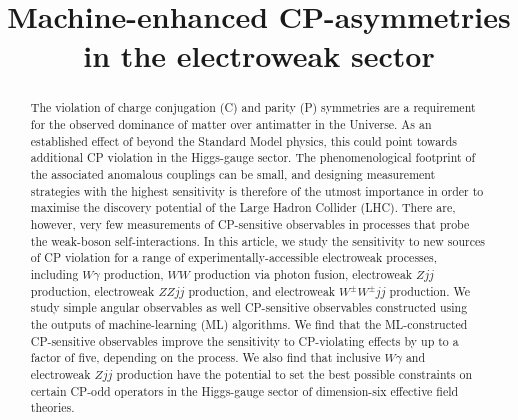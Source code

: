 \documentclass[twocolumn,preprintnumbers,superscriptaddress,nofootinbib,aps,prd,floatfix]{revtex4}
\begin{document}
\providecommand{\abs}[1]{\lvert#1\rvert}

\newcommand{\Znunujets}{(Z\to{\nu\bar{\nu}})+\text{jets}}
\newcommand{\Welnujets}{(W\to{\ell\nu})+\text{jets}}
\newcommand{\Znunujet}{(Z\to{\nu\bar{\nu}})+\text{jet}}
\newcommand{\Welnujet}{(W\to{\ell\nu})+\text{jet}} 


\title{Machine-enhanced CP-asymmetries in the electroweak sector}
\begin{abstract}
The violation of charge conjugation (C) and parity (P) symmetries are a requirement for the observed dominance of matter over antimatter in the Universe. As an established effect of beyond the Standard Model physics, this could point towards additional CP violation in the Higgs-gauge sector. The phenomenological footprint of the associated anomalous couplings can be small, and designing measurement strategies with the highest sensitivity is therefore of the utmost importance in order to maximise the discovery potential of the Large Hadron Collider (LHC). There are, however, very few  measurements of CP-sensitive observables in processes that probe the weak-boson self-interactions. In this article, we study the sensitivity to new sources of CP violation for a range of experimentally-accessible electroweak processes, including $W\gamma$ production, $WW$ production via photon fusion, electroweak $Zjj$ production, electroweak $ZZjj$ production, and electroweak $W^\pm W^\pm jj$ production.  We study simple angular observables as well CP-sensitive observables constructed using the outputs of machine-learning (ML) algorithms. We find that the ML-constructed CP-sensitive observables improve the sensitivity to CP-violating effects by up to a factor of five, depending on the process. We also find that inclusive $W\gamma$ and electroweak $Zjj$ production have the potential to set the best possible constraints on certain CP-odd operators in the Higgs-gauge sector of dimension-six effective field theories.
\end{abstract}
\end{document}
